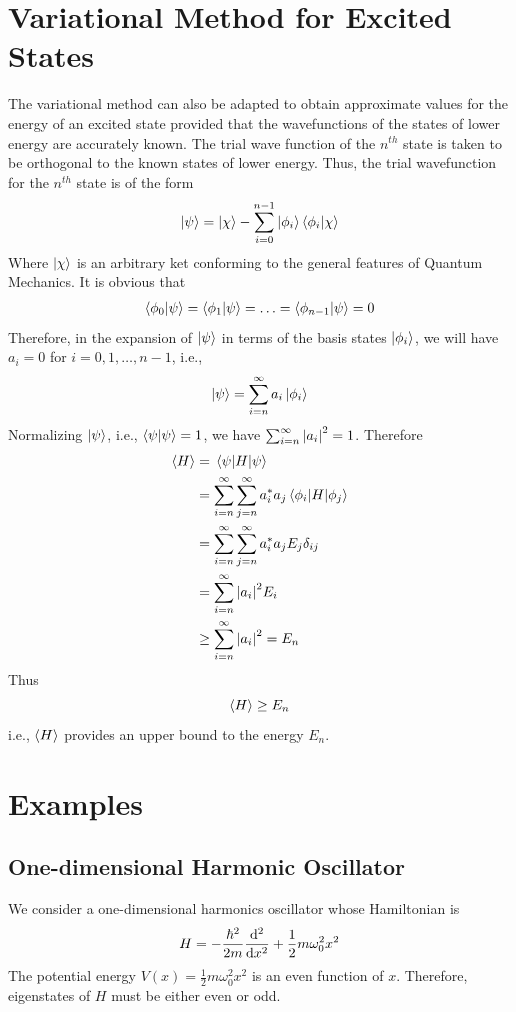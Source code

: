 	\section{Variational Method for Excited States}
	The variational method can also be adapted to obtain approximate values for the energy of an excited state provided that the wavefunctions of the states of lower energy are accurately known. The trial wave function of the $n^{th}$ state is taken to be orthogonal to the known states of lower energy. Thus, the trial wavefunction for the $n^{th}$ state is of the form
	\begin{align*}
		\ket{\psi} = \ket{\chi} - \sum_{i=0}^{n-1} \ket{\phi_i}\braket{\phi_i}{\chi}
	\end{align*}
	Where $\ket{\chi}$ is an arbitrary ket conforming to the general features of Quantum Mechanics. It is obvious that
	\begin{align*}
		\braket{\phi_0}{\psi}  = 		\braket{\phi_1}{\psi} = \ldots = 		\braket{\phi_{n-1}}{\psi} = 0
	\end{align*}
	Therefore, in the expansion of $\ket{\psi}$ in terms of the basis states $\ket{\phi_i}$, we will have $a_i=0$ for $i=0,1,\ldots,n-1$, i.e.,
	\begin{equation*}
		\ket{\psi} = \sum_{i=n}^{\infty} a_i \ket{\phi_i}
	\end{equation*}
	Normalizing $\ket{\psi}$, i.e., $\braket{\psi}{\psi} = 1$, we have $\sum_{i=n}^{\infty} \abs{a_i}^2 = 1$.
	Therefore
	\begin{align*}
		\expval{H} 
		&= \expval{H}{\psi} \\
		&= \sum_{i=n}^{\infty} \sum_{j=n}^{\infty} a^{*}_{i} a_{j} \mel{\phi_i}{H}{\phi_j} \\
		&= \sum_{i=n}^{\infty} \sum_{j=n}^{\infty} a^{*}_{i} a_{j} E_j \delta_{i j} \\
		&= \sum_{i=n}^{\infty} \abs{a_i}^2 E_i \\
		&\geq \sum_{i=n}^{\infty} \abs{a_i}^2 = E_n
	\end{align*}
	Thus
	\begin{equation}
		\expval{H} \geq E_n
	\end{equation}
	i.e., $\expval{H}$ provides an upper bound to the energy $E_n$.
	
	
	\section{Examples}
	\subsection{One-dimensional Harmonic Oscillator}
	We consider a one-dimensional harmonics oscillator whose Hamiltonian is 
	\begin{equation*}
		H = - \frac{\hbar^2}{2 m}\dv[2]{}{x} + \frac{1}{2} m \omega_0^2 x^2
	\end{equation*}
	The potential energy $V(x)=\frac{1}{2} m \omega_0^2 x^2$ is an even function of $x$. Therefore, eigenstates of $H$ must be either even or odd.
	
